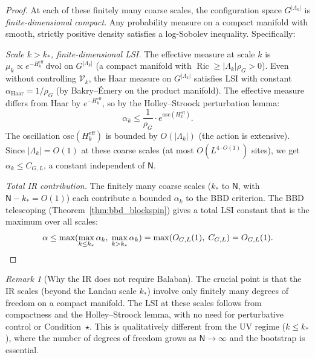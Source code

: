\documentclass[11pt,a4paper]{article}
\theoremstyle{plain}
\theoremstyle{definition}
\theoremstyle{remark}
\newtheorem{remark}[theorem]{Remark}
\newcommand{\Ric}{\operatorname{Ric}}
\newcommand{\cV}{\mathcal{V}}
\begin{document}
\begin{proof}
At each of these finitely many coarse scales, the
configuration space $G^{|\Lambda_k|}$ is
\emph{finite-dimensional compact}. Any probability measure
on a compact manifold with smooth, strictly positive
density satisfies a log-Sobolev inequality. Specifically:

\emph{Scale $k > k_*$, finite-dimensional LSI.}
The effective measure at scale $k$ is
$\mu_k \propto e^{-H_k^{\mathrm{eff}}}\,\mathrm{dvol}$
on $G^{|\Lambda_k|}$ (a compact manifold with
$\Ric \ge |\Lambda_k|\rho_G > 0$). Even without
controlling $\cV_k$, the Haar measure on
$G^{|\Lambda_k|}$ satisfies LSI with constant
$\alpha_{\mathrm{Haar}} = 1/\rho_G$ (by Bakry--\'Emery
on the product manifold). The effective measure differs
from Haar by $e^{-H_k^{\mathrm{eff}}}$, so by the
Holley--Stroock perturbation lemma:
\begin{equation}
  \alpha_k \le \frac{1}{\rho_G}\cdot
  e^{\mathrm{osc}(H_k^{\mathrm{eff}})}.
\end{equation}
The oscillation $\mathrm{osc}(H_k^{\mathrm{eff}})$ is
bounded by $O(|\Lambda_k|)$ (the action is extensive).
Since $|\Lambda_k| = O(1)$ at these coarse scales
(at most $O(L^{4\cdot O(1)})$ sites), we get
$\alpha_k \le C_{G,L}$, a constant independent of $\mathsf{N}$.

\emph{Total IR contribution.}
The finitely many coarse scales ($k_*$ to $\mathsf{N}$, with
$\mathsf{N} - k_* = O(1)$) each contribute a bounded
$\alpha_k$ to the BBD criterion. The BBD telescoping
(Theorem~\ref{thm:bbd_blockspin}) gives a total
LSI constant that is the maximum over all scales:
\begin{equation}
  \alpha \le \max(\max_{k \le k_*}\alpha_k,\;
  \max_{k > k_*}\alpha_k)
  = \max(O_{G,L}(1),\; C_{G,L}) = O_{G,L}(1).
  \qedhere
\end{equation}
\end{proof}

\begin{remark}[Why the IR does not require Balaban]
The crucial point is that the IR scales (beyond the
Landau scale $k_*$) involve only finitely many
degrees of freedom on a compact manifold. The LSI
at these scales follows from compactness and the
Holley--Stroock lemma, with no need for perturbative
control or Condition~$\star$. This is qualitatively
different from the UV regime ($k \le k_*$), where the
number of degrees of freedom grows as $\mathsf{N} \to \infty$
and the bootstrap is essential.
\end{remark}


\end{document}
